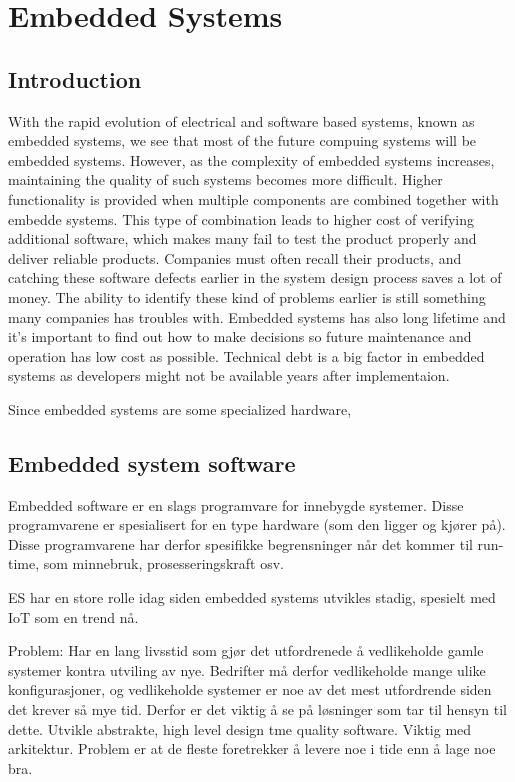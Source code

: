 \chapter{Embedded Systems}
\section{Introduction}
With the rapid evolution of electrical and software based systems, known as embedded systems, we see that most of the future compuing systems will be embedded systems\cite{wolfmadsen-2000}. However, as the complexity of embedded systems increases, maintaining the quality of such systems becomes more difficult. Higher functionality is provided when multiple components are combined together with embedde systems. This type of combination leads to higher cost of verifying additional software, which makes many fail to test the product properly and deliver reliable products. Companies must often recall their products, and catching these software defects earlier in the system design process saves a lot of money. The ability to identify these kind of problems earlier is still something many companies has troubles with. Embedded systems has also long lifetime and it's important to find out how to make decisions so future maintenance and operation has low cost as possible. Technical debt is a big factor in embedded systems as developers might not be available years after implementaion. 

Since embedded systems are some specialized hardware,


\section{Embedded system software}


Embedded software er en slags programvare for innebygde systemer. Disse programvarene er spesialisert for en type hardware (som den ligger og kjører på). Disse programvarene har derfor spesifikke begrensninger når det kommer til run-time, som minnebruk, prosesseringskraft osv.

ES har en store rolle idag siden embedded systems utvikles stadig, spesielt med IoT som en trend nå.

Problem: Har en lang livsstid som gjør det utfordrenede å vedlikeholde gamle systemer kontra utviling av nye. Bedrifter må derfor vedlikeholde mange ulike konfigurasjoner, og vedlikeholde systemer er noe av det mest utfordrende siden det krever så mye tid. Derfor er det viktig å se på løsninger som tar til hensyn til dette. Utvikle abstrakte, high level design tme quality software. Viktig med arkitektur. Problem er at de fleste foretrekker å levere noe i tide enn å lage noe bra.

